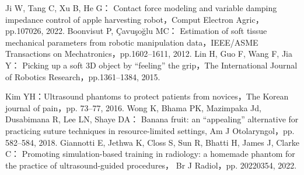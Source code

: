 \documentclass[a4paper]{jarticle}
\begin{document}
\begin{thebibliography}{9}
    Ji W, Tang C, Xu B, He G：
    Contact force modeling and variable damping impedance control of apple harvesting robot，Comput Electron Agric，pp.107026, 2022.
    Boonvisut P, Çavuşoğlu MC：
    Estimation of soft tissue mechanical parameters from robotic manipulation data，IEEE/ASME Transactions on Mechatronics，pp.1602–1611, 2012.
    Lin H, Guo F, Wang F, Jia Y：
    Picking up a soft 3D object by “feeling” the grip，The International Journal of Robotics Research，pp.1361–1384, 2015.

    Kim YH：Ultrasound phantoms to protect patients from novices，The Korean journal of pain，pp. 73–77, 2016.
    Wong K, Bhama PK, Mazimpaka Jd, Dusabimana R, Lee LN, Shaye DA：
    Banana fruit: an “appealing” alternative for practicing suture techniques in resource-limited settings, 
    Am J Otolaryngol，pp. 582–584, 2018.
    Giannotti E, Jethwa K, Closs S, Sun R, Bhatti H, James J, Clarke C：
    Promoting simulation-based training in radiology: a homemade phantom for the practice of ultrasound-guided procedures，
    Br J Radiol，pp. 20220354, 2022.




    

\end{thebibliography}
\end{document}
